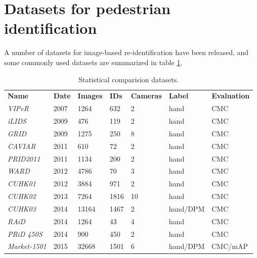 \section{Datasets for pedestrian identification}

A number of datasets for image-based re-identification have been released, and some commonly used datasets are summarized in table \ref{tableID}. 


\begin{table}[H]
\centering

\begin{tabular}{lllllll}
\textbf{Name}        & \textbf{Date} & \textbf{Images} & \textbf{IDs} & \textbf{Cameras} & \textbf{Label} & \textbf{Evaluation} \\
\textit{VIPeR} \cite{viper}      & 2007          & 1264                      & 632          & 2                & hand           & CMC                 \\
\textit{iLIDS}  \cite{lids}      & 2009          & 476                       & 119          & 2                & hand           & CMC                 \\
\textit{GRID}   \cite{grid}     & 2009          & 1275                      & 250          & 8                & hand           & CMC                 \\
\textit{CAVIAR} \cite{caviar}      & 2011          & 610                       & 72           & 2                & hand           & CMC                 \\
\textit{PRID2011} \cite{prod11}   & 2011          & 1134                      & 200          & 2                & hand           & CMC                 \\
\textit{WARD}   \cite{ward}     & 2012          & 4786                      & 70           & 3                & hand           & CMC                 \\
\textit{CUHK01} \cite{cuk1}     & 2012          & 3884                      & 971          & 2                & hand           & CMC                 \\
\textit{CUHK02}  \cite{cuk2}    & 2013          & 7264                      & 1816         & 10               & hand           & CMC                 \\
\textit{CUHK03}  \cite{cuk3}    & 2014          & 13164                     & 1467         & 2                & hand/DPM       & CMC                 \\
\textit{RAiD}  \cite{raid}      & 2014          & 1264                      & 43           & 4                & hand           & CMC                 \\
\textit{PRiD 450S} \cite{prid450}   & 2014          & 900                       & 450          & 2                & hand           & CMC                 \\
\textit{Market-1501} \cite{market} & 2015          & 32668                     & 1501         & 6                & hand/DPM       & CMC/mAP            
\end{tabular}
\caption{Statistical comparision datasets.}
\label{tableID}
\end{table}

